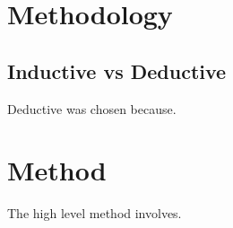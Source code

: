 \section{Methodology}
\subsection{Inductive vs Deductive}
Deductive was chosen because.


\section{Method}
The high level method involves.